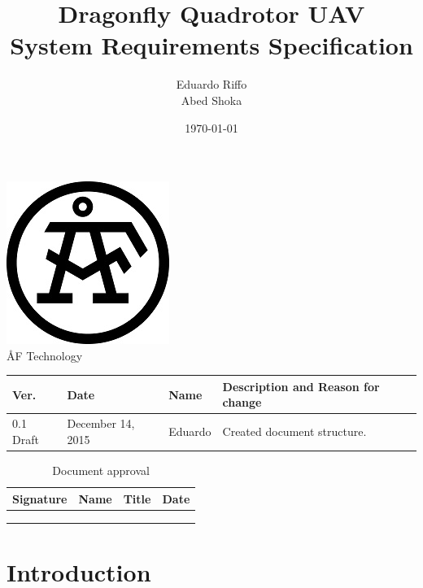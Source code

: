\documentclass[a4paper]{article}
\title{Dragonfly Quadrotor UAV \\ System Requirements Specification}
\author{Eduardo Riffo \\ Abed Shoka}
\date{\today}
\begin{document}

\maketitle                      	%

\begin{center}
\vspace{64pt}
\includegraphics[scale=1.6]{images/AF_Logotype20141_Black.png}
\vspace{16pt}
\\ \large ÅF Technology
\end{center}

\vspace{16pt}
\begin{tabular}{ l l l p{8.5cm} }
	Ver. & Date & Name & Description and Reason for change \\\hline
	0.1 Draft & December 14, 2015 & Eduardo & Created document structure.\\
\end{tabular}

\begin{table}[]
\centering
\caption{Document approval}
\begin{tabular}{c c c c}
\hline\hline
Signature & Name & Title & Date \\ [0.5ex]
\hline
	& & & \\
	& & & \\
	& & & \\
\hline
\end{tabular}
\label{table:nonline}	
\end{table}

\newpage

\tableofcontents				%

\newpage

\section{Introduction}
\end{document}

